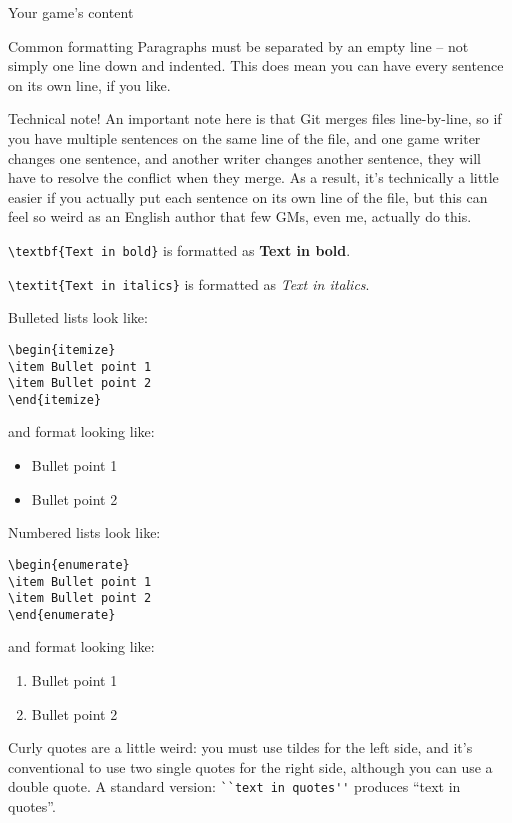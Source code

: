 \documentclass{article}
\begin{document}
\begin{section}{Your game's content}
\begin{subsection}{Common formatting}
Paragraphs must be separated by an empty line – not simply one line down and indented.  This does mean you can have every sentence on its own line, if you like.  

Technical note! An important note here is that Git merges files line-by-line, so if you have multiple sentences on the same line of the file, and one game writer changes one sentence, and another writer changes another sentence, they will have to resolve the conflict when they merge.  As a result, it's technically a little easier if you actually put each sentence on its own line of the file, but this can feel so weird as an English author that few GMs, even me, actually do this.

\lstinline|\textbf{Text in bold}| is formatted as \textbf{Text in bold}.

\lstinline|\textit{Text in italics}| is formatted as \textit{Text in italics}.

Bulleted lists look like:
\begin{verbatim}
\begin{itemize}
\item Bullet point 1
\item Bullet point 2
\end{itemize}
\end{verbatim}
and format looking like:
\begin{itemize}
\item Bullet point 1
\item Bullet point 2
\end{itemize}

Numbered lists look like:
\begin{verbatim}
\begin{enumerate}
\item Bullet point 1
\item Bullet point 2
\end{enumerate}
\end{verbatim}
and format looking like:
\begin{enumerate}
\item Bullet point 1
\item Bullet point 2
\end{enumerate}

Curly quotes are a little weird: you must use tildes for the left side, and it's conventional to use two single quotes for the right side, although you can use a double quote.  A standard version: \lstinline{``text in quotes''} produces ``text in quotes''.


\end{subsection}
\end{section}
\end{document}
